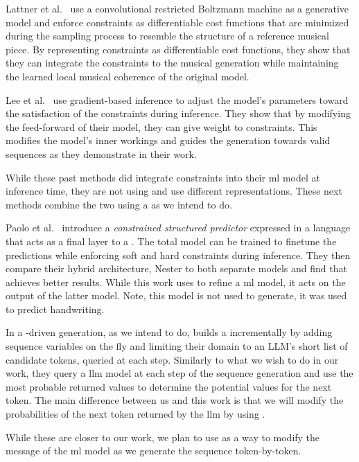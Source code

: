 \documentclass[../Document.tex]{subfiles}
\begin{document}
Lattner et al.~\cite{lattner2018imposing} use a convolutional restricted Boltzmann machine as a generative model and enforce constraints as differentiable cost functions that are minimized during the sampling process to resemble the structure of a reference musical piece.
By representing constraints as differentiable cost functions, they show that they can integrate the constraints to the musical generation while maintaining the learned local musical coherence of the original model.

Lee et al.~\cite{lee2019gradient} use gradient-based inference to adjust the model's parameters toward the satisfaction of the constraints during inference.
They show that by modifying the feed-forward of their model, they can give weight to constraints.
This modifies the model's inner workings and guides the generation towards valid sequences as they demonstrate in their work.

While these past methods did integrate constraints into their \gls{ml} model at inference time, they are not using \cp and use different representations.
These next methods combine the two using a \csp as we intend to do.

Paolo et al.~\cite{DBLP:conf/nesy/DragoneTP21} introduce a \emph{constrained structured predictor} expressed in a \cp language that acts as a final layer to a \nn.
The total model can be trained to finetune the predictions while enforcing soft and hard constraints during inference.
They then compare their hybrid architecture, {\sc Nester} to both separate models and find that achieves better results.
While this work uses \cp to refine a \gls{ml} model, it acts on the output of the latter model.
Note, this model is not used to generate, it was used to predict handwriting.

In a \cp-driven generation, as we intend to do, \cite{DBLP:conf/cp/ReginMB24} builds a \csp incrementally by adding sequence variables on the fly and limiting their domain to an LLM's short list of candidate tokens, queried at each step.
Similarly to what we wish to do in our work, they query a \gls{llm} model at each step of the sequence generation and use the most probable returned values to determine the potential values for the next token.
The main difference between us and this work is that we will modify the probabilities of the next token returned by the \gls{llm} by using \bp.

While these are closer to our work, we plan to use \cp as a way to modify the message of the \gls{ml} model as we generate the sequence token-by-token.
\end{document}
